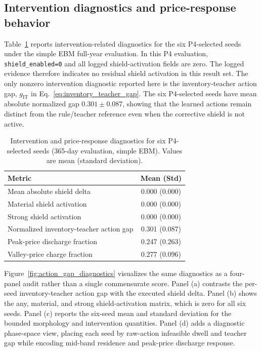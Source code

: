 \subsection{Intervention diagnostics and price-response behavior}

Table~\ref{tab:shield_dependence} reports intervention-related diagnostics for the six P4-selected seeds under the simple EBM full-year evaluation. In this P4 evaluation, \texttt{shield\_enabled=0} and all logged shield-activation fields are zero. The logged evidence therefore indicates no residual shield activation in this result set. The only nonzero intervention diagnostic reported here is the inventory-teacher action gap, $g_{\mathrm{IT}}$ in Eq.~\eqref{eq:inventory_teacher_gap}. The six P4-selected seeds have mean absolute normalized gap $0.301 \pm 0.087$, showing that the learned actions remain distinct from the rule/teacher reference even when the corrective shield is not active.

\begin{table}[!t]
\centering
\footnotesize
\setlength{\tabcolsep}{5pt}
\renewcommand{\arraystretch}{1.12}
\caption{Intervention and price-response diagnostics for six P4-selected seeds (365-day evaluation, simple EBM). Values are mean (standard deviation).}
\label{tab:shield_dependence}
\begin{tabular}{lc}
\toprule
Metric & Mean (Std) \\
\midrule
Mean absolute shield delta & 0.000 (0.000) \\
Material shield activation & 0.000 (0.000) \\
Strong shield activation & 0.000 (0.000) \\
Normalized inventory-teacher action gap & 0.301 (0.087) \\
Peak-price discharge fraction & 0.247 (0.263) \\
Valley-price charge fraction & 0.277 (0.096) \\
\bottomrule
\end{tabular}
\end{table}

Figure~\ref{fig:action_gap_diagnostics} visualizes the same diagnostics as a four-panel audit rather than a single commensurate score. Panel (a) contrasts the per-seed inventory-teacher action gap with the executed shield delta. Panel (b) shows the any, material, and strong shield-activation matrix, which is zero for all six seeds. Panel (c) reports the six-seed mean and standard deviation for the bounded morphology and intervention quantities. Panel (d) adds a diagnostic phase-space view, placing each seed by raw-action infeasible dwell and teacher gap while encoding mid-band residence and peak-price discharge response.

